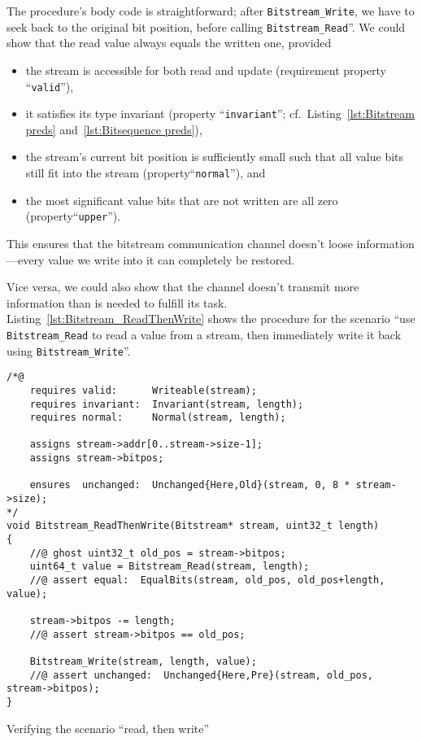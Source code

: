 The procedure's body code is straightforward; after
\lstinline{Bitstream_Write}, we have to seek back to the original bit
position, before calling \lstinline{Bitstream_Read}''.
%
We could show that the read value always equals the written one,
provided
\begin{itemize}
\item the stream is accessible for both read and update
	(requirement property ``\lstinline{valid}''),
\item it satisfies its type invariant (property
	``\lstinline{invariant}''; cf.\ Listing~\ref{lst:Bitstream preds}
	and~\ref{lst:Bitsequence preds}),
\item the stream's current bit position is sufficiently small such that
	all value bits still fit into the stream
	(property``\lstinline{normal}''), and
\item the most significant value bits that are not written are all zero
	(property``\lstinline{upper}'').
\end{itemize}
%
This ensures that the bitstream communication channel doesn't loose
information---every value we write into it can completely be
restored.



Vice versa, we could also show that the channel doesn't transmit more
information than is needed to fulfill its task.
%
Listing~\ref{lst:Bitstream_ReadThenWrite}
shows the procedure for the scenario ``use \lstinline{Bitstream_Read}
to read a value from a stream, then immediately write it back using
\lstinline{Bitstream_Write}''.




\begin{listing}[hbt]
\begin{minipage}{0.99\textwidth}
\begin{lstlisting}[style=acsl-block]
/*@
    requires valid:      Writeable(stream);
    requires invariant:  Invariant(stream, length);
    requires normal:     Normal(stream, length);

    assigns stream->addr[0..stream->size-1];
    assigns stream->bitpos;

    ensures  unchanged:  Unchanged{Here,Old}(stream, 0, 8 * stream->size);
*/
void Bitstream_ReadThenWrite(Bitstream* stream, uint32_t length)
{
    //@ ghost uint32_t old_pos = stream->bitpos;
    uint64_t value = Bitstream_Read(stream, length);
    //@ assert equal:  EqualBits(stream, old_pos, old_pos+length, value);

    stream->bitpos -= length;
    //@ assert stream->bitpos == old_pos;

    Bitstream_Write(stream, length, value);
    //@ assert unchanged:  Unchanged{Here,Pre}(stream, old_pos, stream->bitpos);
}
\end{lstlisting}
\end{minipage}
\caption{\label{lst:Bitstream_ReadThenWrite}
	Verifying the scenario ``read, then write'' }
\end{listing}



